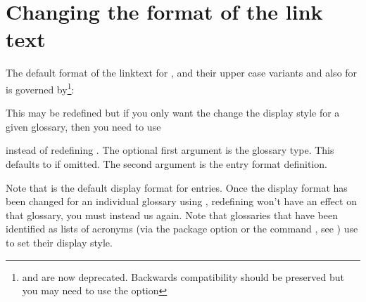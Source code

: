 \documentclass[report,inlinetitle]{nlctdoc}
\begin{document}
\begin{definition}[\DescribeMacro{\GLSuserv}]
\end{definition}
\begin{definition}[\DescribeMacro{\glsuservi}]
\end{definition}
\begin{definition}[\DescribeMacro{\Glsuservi}]
\end{definition}
\begin{definition}[\DescribeMacro{\GLSuservi}]
\end{definition}

\section{Changing the format of the link text}
\label{sec:glsdisplay}

The default format of the \gls{linktext} for , 
and their upper case variants and also for  is governed 
by\footnote{ and  are now
deprecated. Backwards compatibility should be preserved but
you may need to use the  option}:
\begin{definition}[\DescribeMacro{\glsentryfmt}]
\end{definition}
This may be redefined but if you only want the change the display style 
for a given glossary, then you need to use
\begin{definition}
\end{definition}
instead of redefining . The optional first argument 
 is the glossary type. This defaults to
 if omitted. The second argument is the
entry format definition.

\begin{important}
Note that  is the default display format for
entries. Once the display format has been changed for an individual
glossary using , redefining 
won't have an effect on that glossary, you must instead us
 again. Note that glossaries that have
been identified as lists of acronyms (via the package option
 or the command , 
see ) use 
 to set their display style.
\end{important}
\end{document}
